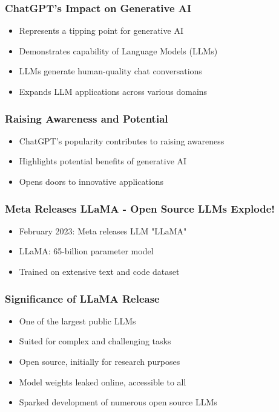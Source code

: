 \begin{frame}[fragile]\frametitle{ChatGPT's Impact on Generative AI}
    \begin{itemize}
        \item Represents a tipping point for generative AI
        \item Demonstrates capability of Language Models (LLMs)
        \item LLMs generate human-quality chat conversations
        \item Expands LLM applications across various domains
    \end{itemize}
\end{frame}

\begin{frame}[fragile]\frametitle{Raising Awareness and Potential}
    \begin{itemize}
        \item ChatGPT's popularity contributes to raising awareness
        \item Highlights potential benefits of generative AI
        \item Opens doors to innovative applications
    \end{itemize}
\end{frame}


\begin{frame}[fragile]\frametitle{Meta Releases LLaMA - Open Source LLMs Explode!}
    \begin{itemize}
        \item February 2023: Meta releases LLM "LLaMA"
        \item LLaMA: 65-billion parameter model
        \item Trained on extensive text and code dataset
    \end{itemize}
\end{frame}

\begin{frame}[fragile]\frametitle{Significance of LLaMA Release}
    \begin{itemize}
        \item One of the largest public LLMs
        \item Suited for complex and challenging tasks
        \item Open source, initially for research purposes
        \item Model weights leaked online, accessible to all
        \item Sparked development of numerous open source LLMs
    \end{itemize}
\end{frame}


